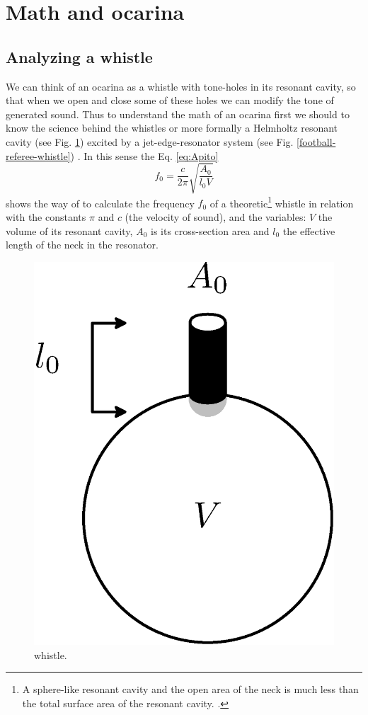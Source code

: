 \documentclass[11pt,twocolumn]{article}
\begin{document}
\section{Math and ocarina}

\subsection{Analyzing a whistle}
We can think of an ocarina as a whistle with tone-holes in its resonant cavity,
so that when we open and close some of these holes we can modify the tone of generated sound.
Thus to understand the math of an ocarina first we should to know the science behind the whistles  
or more formally a Helmholtz resonant cavity \cite{corning2011resonance} (see Fig. \ref{fig:resonador}) excited by a jet-edge-resonator system (see Fig. \ref{football-referee-whistle}) \cite[pp. 3]{gibiat2013acoustic} \cite[pp. 138]{nyborg1953characteristics}. 
In this sense the Eq. \ref{eq:Apito} 
\begin{equation} 
\label{eq:Apito}
 f_0 = \frac{c}{2 \pi} \sqrt{\frac{A_{0}}{l_{0}V} }  
\end{equation}
shows the way of to calculate the frequency $f_0$ of a theoretic\footnote{A sphere-like resonant cavity and the open area of the neck is much less than the total surface area of the resonant cavity. .} whistle \cite[pp. 3]{gibiat2013acoustic} \cite[pp. 5]{kobayashi20093d} \cite[pp. 265]{okadanumerical}
in relation with the constants $\pi$  and $c$ (the velocity of sound),  and 
the variables: $V$ the volume of its resonant cavity,
$A_0$ is its cross-section area and $l_0$ the effective length of the neck in the resonator.


\begin{figure}[ht!]
\centering
\includegraphics[width=0.350\columnwidth]{resonador.eps}
\caption{whistle. }
\label{fig:resonador}
\end{figure}
\end{document}
